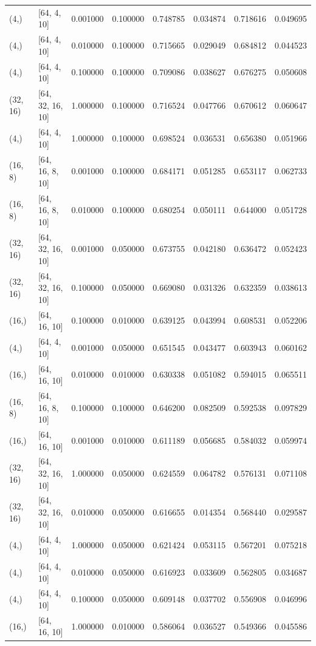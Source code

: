\begin{tabular}{llrrrrrr}
(4,) & [64, 4, 10] & 0.001000 & 0.100000 & 0.748785 & 0.034874 & 0.718616 & 0.049695 \\
(4,) & [64, 4, 10] & 0.010000 & 0.100000 & 0.715665 & 0.029049 & 0.684812 & 0.044523 \\
(4,) & [64, 4, 10] & 0.100000 & 0.100000 & 0.709086 & 0.038627 & 0.676275 & 0.050608 \\
(32, 16) & [64, 32, 16, 10] & 1.000000 & 0.100000 & 0.716524 & 0.047766 & 0.670612 & 0.060647 \\
(4,) & [64, 4, 10] & 1.000000 & 0.100000 & 0.698524 & 0.036531 & 0.656380 & 0.051966 \\
(16, 8) & [64, 16, 8, 10] & 0.001000 & 0.100000 & 0.684171 & 0.051285 & 0.653117 & 0.062733 \\
(16, 8) & [64, 16, 8, 10] & 0.010000 & 0.100000 & 0.680254 & 0.050111 & 0.644000 & 0.051728 \\
(32, 16) & [64, 32, 16, 10] & 0.001000 & 0.050000 & 0.673755 & 0.042180 & 0.636472 & 0.052423 \\
(32, 16) & [64, 32, 16, 10] & 0.100000 & 0.050000 & 0.669080 & 0.031326 & 0.632359 & 0.038613 \\
(16,) & [64, 16, 10] & 0.100000 & 0.010000 & 0.639125 & 0.043994 & 0.608531 & 0.052206 \\
(4,) & [64, 4, 10] & 0.001000 & 0.050000 & 0.651545 & 0.043477 & 0.603943 & 0.060162 \\
(16,) & [64, 16, 10] & 0.010000 & 0.010000 & 0.630338 & 0.051082 & 0.594015 & 0.065511 \\
(16, 8) & [64, 16, 8, 10] & 0.100000 & 0.100000 & 0.646200 & 0.082509 & 0.592538 & 0.097829 \\
(16,) & [64, 16, 10] & 0.001000 & 0.010000 & 0.611189 & 0.056685 & 0.584032 & 0.059974 \\
(32, 16) & [64, 32, 16, 10] & 1.000000 & 0.050000 & 0.624559 & 0.064782 & 0.576131 & 0.071108 \\
(32, 16) & [64, 32, 16, 10] & 0.010000 & 0.050000 & 0.616655 & 0.014354 & 0.568440 & 0.029587 \\
(4,) & [64, 4, 10] & 1.000000 & 0.050000 & 0.621424 & 0.053115 & 0.567201 & 0.075218 \\
(4,) & [64, 4, 10] & 0.010000 & 0.050000 & 0.616923 & 0.033609 & 0.562805 & 0.034687 \\
(4,) & [64, 4, 10] & 0.100000 & 0.050000 & 0.609148 & 0.037702 & 0.556908 & 0.046996 \\
(16,) & [64, 16, 10] & 1.000000 & 0.010000 & 0.586064 & 0.036527 & 0.549366 & 0.045586 \\

\end{tabular}
